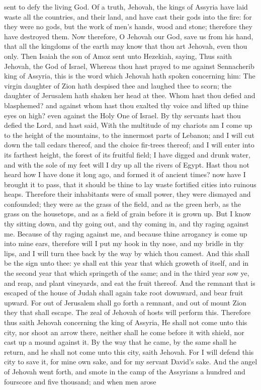 sent to defy the living God. Of a truth, Jehovah, the kings of Assyria have laid waste all the countries, and their land, and have cast their gods into the fire: for they were no gods, but the work of men’s hands, wood and stone; therefore they have destroyed them. Now therefore, O Jehovah our God, save us from his hand, that all the kingdoms of the earth may know that thou art Jehovah, even thou only.  Then Isaiah the son of Amoz sent unto Hezekiah, saying, Thus saith Jehovah, the God of Israel, Whereas thou hast prayed to me against Sennacherib king of Assyria, this is the word which Jehovah hath spoken concerning him: The virgin daughter of Zion hath despised thee and laughed thee to scorn; the daughter of Jerusalem hath shaken her head at thee. Whom hast thou defied and blasphemed? and against whom hast thou exalted thy voice and lifted up thine eyes on high? even against the Holy One of Israel. By thy servants hast thou defied the Lord, and hast said, With the multitude of my chariots am I come up to the height of the mountains, to the innermost parts of Lebanon; and I will cut down the tall cedars thereof, and the choice fir-trees thereof; and I will enter into its farthest height, the forest of its fruitful field; I have digged and drunk water, and with the sole of my feet will I dry up all the rivers of Egypt.  Hast thou not heard how I have done it long ago, and formed it of ancient times? now have I brought it to pass, that it should be thine to lay waste fortified cities into ruinous heaps. Therefore their inhabitants were of small power, they were dismayed and confounded; they were as the grass of the field, and as the green herb, as the grass on the housetops, and as a field of grain before it is grown up. But I know thy sitting down, and thy going out, and thy coming in, and thy raging against me. Because of thy raging against me, and because thine arrogancy is come up into mine ears, therefore will I put my hook in thy nose, and my bridle in thy lips, and I will turn thee back by the way by which thou camest.  And this shall be the sign unto thee: ye shall eat this year that which groweth of itself, and in the second year that which springeth of the same; and in the third year sow ye, and reap, and plant vineyards, and eat the fruit thereof. And the remnant that is escaped of the house of Judah shall again take root downward, and bear fruit upward. For out of Jerusalem shall go forth a remnant, and out of mount Zion they that shall escape. The zeal of Jehovah of hosts will perform this.  Therefore thus saith Jehovah concerning the king of Assyria, He shall not come unto this city, nor shoot an arrow there, neither shall he come before it with shield, nor cast up a mound against it. By the way that he came, by the same shall he return, and he shall not come unto this city, saith Jehovah. For I will defend this city to save it, for mine own sake, and for my servant David’s sake.  And the angel of Jehovah went forth, and smote in the camp of the Assyrians a hundred and fourscore and five thousand; and when men arose 